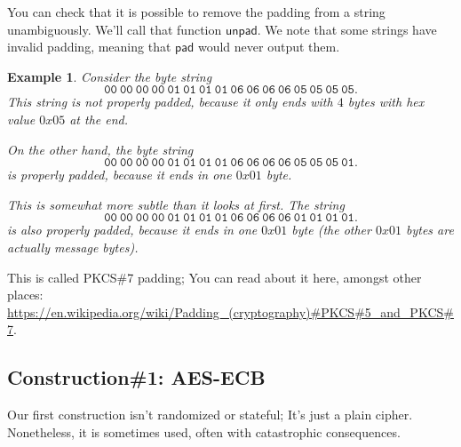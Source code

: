 \documentclass[11pt]{article}
\newtheorem{example}{Example}
\newcommand{\pad}{\mathsf{pad}}
\newcommand{\unpad}{\mathsf{unpad}}
\begin{document}
You can check that it is possible to remove the padding from a string
unambiguously. We'll call that function $\unpad$. We note that some strings
have invalid padding, meaning that $\pad$ would never output them.
\begin{example}
    Consider the byte string
    \[
        \mathtt{00\ 00\ 00\ 00\ 01\ 01\ 01\ 01\ 06\ 06\ 06\ 06\ 05\ 05\ 05\ 05}.
    \]
    This string is not properly padded, because it only ends with $4$ bytes
    with hex value $0x05$ at the end.

    On the other hand, the byte string
    \[
        \mathtt{00\ 00\ 00\ 00\ 01\ 01\ 01\ 01\ 06\ 06\ 06\ 06\ 05\ 05\ 05\ 01}.
    \]
    \emph{is} properly padded, because it ends in one $0x01$ byte.

    This is somewhat more subtle than it looks at first. The string
    \[
        \mathtt{00\ 00\ 00\ 00\ 01\ 01\ 01\ 01\ 06\ 06\ 06\ 06\ 01\ 01\ 01\ 01}.
    \]
    is also properly padded, because it ends in one $0x01$ byte (the other
    $0x01$ bytes are actually message bytes).
\end{example}
This is called PKCS\#7 padding; You can read about it here, amongst other
places:
\url{https://en.wikipedia.org/wiki/Padding_(cryptography)#PKCS#5_and_PKCS#7}.


\subsection{Construction\#1: AES-ECB}

Our first construction isn't randomized or stateful; It's just a plain cipher.
Nonetheless, it is sometimes used, often with catastrophic consequences.
\end{document}
